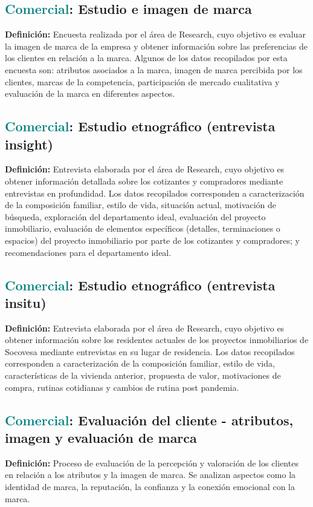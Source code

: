 \documentclass[12pt]{article}
\begin{document}
\subsection{\textcolor{teal}{Comercial}: Estudio e imagen de marca}
\textbf{Definición:} Encuesta realizada por el área de Research, cuyo objetivo es evaluar la imagen de marca de la empresa y obtener información sobre las preferencias de los clientes en relación a la marca. Algunos de los datos recopilados por esta encuesta son: atributos asociados a la marca, imagen de marca percibida por los clientes, marcas de la competencia, participación de mercado cualitativa y evaluación de la marca en diferentes aspectos.
\subsection{\textcolor{teal}{Comercial}: Estudio etnográfico (entrevista insight)}
\textbf{Definición:} Entrevista elaborada por el área de Research, cuyo objetivo es obtener información detallada sobre los cotizantes y compradores mediante entrevistas en profundidad. Los datos recopilados corresponden a caracterización de la composición familiar, estilo de vida, situación actual, motivación de búsqueda, exploración del departamento ideal, evaluación del proyecto inmobiliario, evaluación de elementos específicos (detalles, terminaciones o espacios) del proyecto inmobiliario por parte de los cotizantes y compradores; y recomendaciones para el departamento ideal.
\subsection{\textcolor{teal}{Comercial}: Estudio etnográfico (entrevista insitu)}
\textbf{Definición:} Entrevista elaborada por el área de Research, cuyo objetivo es obtener información sobre los residentes actuales de los proyectos inmobiliarios de Socovesa mediante entrevistas en su lugar de residencia. Los datos recopilados corresponden a caracterización de la composición familiar, estilo de vida, características de la vivienda anterior, propuesta de valor, motivaciones de compra, rutinas cotidianas y cambios de rutina post pandemia.
\subsection{\textcolor{teal}{Comercial}: Evaluación del cliente - atributos, imagen y evaluación de marca}
\textbf{Definición:} Proceso de evaluación de la percepción y valoración de los clientes en relación a los atributos y la imagen de marca. Se analizan aspectos como la identidad de marca, la reputación, la confianza y la conexión emocional con la marca.
\end{document}

